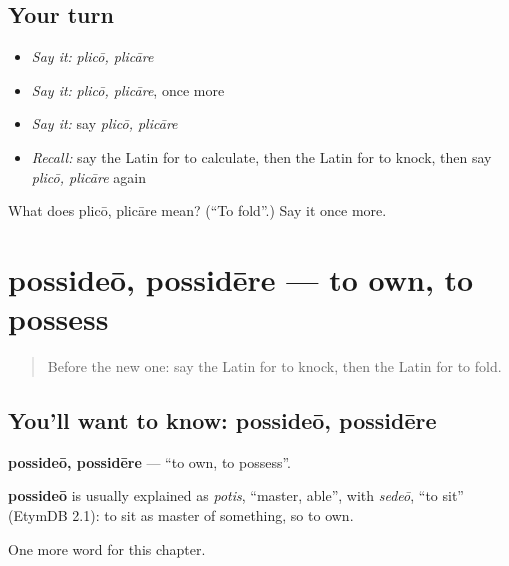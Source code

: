 \subsection*{Your turn}
\begin{itemize}
\raggedright
  \item \emph{Say it:} \emph{plicō, plicāre}
  \item \emph{Say it:} \emph{plicō, plicāre}, once more
  \item \emph{Say it:} say \emph{plicō, plicāre}
  \item \emph{Recall:} say the Latin for to calculate, then the Latin for to knock, then say \emph{plicō, plicāre} again
\end{itemize}

\begin{tcolorbox}[breakable,colback=teal!4,colframe=teal!35!black,title={Before you move on}]
What does plicō, plicāre mean? (\textquotedblleft{}To fold\textquotedblright{}.) Say it once more.
\end{tcolorbox}
\section[possideō, possidēre]{possideō, possidēre — to own, to possess}

\label{lesson:LA-C168-possideo}



\begin{quote}
Before the new one: say the Latin for to knock, then the Latin for to fold.
\end{quote}

\subsection*{You'll want to know: possideō, possidēre}
\textbf{possideō, possidēre} — \textquotedblleft{}to own, to possess\textquotedblright{}.

\begin{cousinweb}
\textbf{possideō} is usually explained as \emph{potis}, \textquotedblleft{}master, able\textquotedblright{}, with \emph{sedeō}, \textquotedblleft{}to sit\textquotedblright{} (EtymDB 2.1): to sit as master of something, so to own.
\end{cousinweb}

\begin{grammarlens}[title={What you've built}]
One more word for this chapter.
\end{grammarlens}

